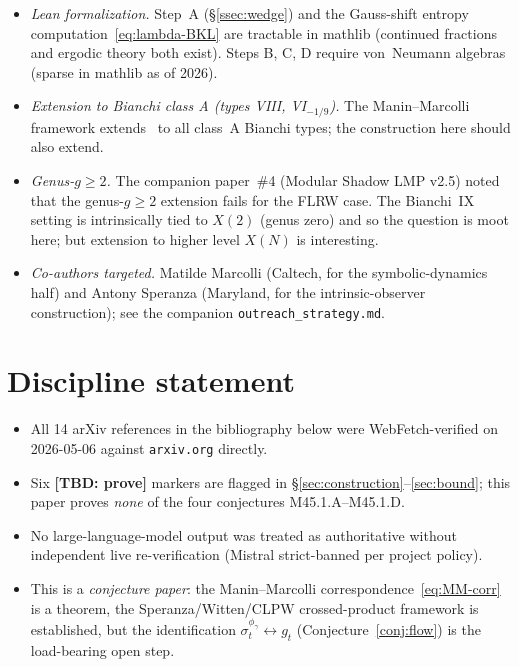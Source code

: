 \documentclass[12pt,a4paper]{article}
\begin{document}
\begin{itemize}
\item \emph{Lean formalization.} Step~A (\S\ref{ssec:wedge}) and the
Gauss-shift entropy computation~\eqref{eq:lambda-BKL} are tractable
in mathlib (continued fractions and ergodic theory both exist).
Steps B, C, D require von~Neumann algebras (sparse in mathlib as of
2026).
\item \emph{Extension to Bianchi class A (types VIII, VI$_{-1/9}$).}
The Manin--Marcolli framework
extends~\cite{ManinMarcolli2015} to all class~A Bianchi types; the
construction here should also extend.
\item \emph{Genus-$g\ge 2$.} The companion paper~\#4 (Modular Shadow
LMP v2.5) noted that the genus-$g\ge 2$ extension fails for the FLRW
case. The Bianchi~IX setting is intrinsically tied to $X(2)$ (genus
zero) and so the question is moot here; but extension to higher level
$X(N)$ is interesting.
\item \emph{Co-authors targeted.} Matilde Marcolli (Caltech, for the
symbolic-dynamics half) and Antony Speranza (Maryland, for the
intrinsic-observer construction); see the companion
\texttt{outreach\_strategy.md}.
\end{itemize}

\section*{Discipline statement}

\begin{itemize}
\item All 14 arXiv references in the bibliography below were
WebFetch-verified on 2026-05-06 against \texttt{arxiv.org} directly.
\item Six \textbf{[TBD: prove]} markers are flagged in
\S\ref{sec:construction}--\ref{sec:bound}; this paper proves
\emph{none} of the four conjectures M45.1.A--M45.1.D.
\item No large-language-model output was treated as authoritative
without independent live re-verification (Mistral strict-banned per
project policy).
\item This is a \emph{conjecture paper}: the Manin--Marcolli
correspondence~\eqref{eq:MM-corr} is a theorem, the
Speranza/Witten/CLPW crossed-product framework is established, but
the identification $\sigma_t^{\phi_\gamma} \leftrightarrow g_t$
(Conjecture~\ref{conj:flow}) is the load-bearing open step.
\end{itemize}
\end{document}

